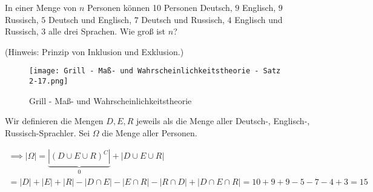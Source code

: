 
\begin{exercise}

In einer Menge von $n$ Personen können 10 Personen Deutsch, $9$ Englisch, $9$ Russisch, $5$ Deutsch und Englisch, $7$ Deutsch und Russisch, $4$ Englisch und Russisch, $3$ alle drei Sprachen.
Wie groß ist $n$?

(Hinweis: Prinzip von Inklusion und Exklusion.)

\end{exercise}


\begin{solution}

\phantom{}



\begin{figure}[h!]
  \centering
  \texttt{[image: Grill - Maß- und Wahrscheinlichkeitstheorie - Satz 2-17.png]}
  \caption{Grill - Maß- und Wahrscheinlichkeitstheorie}
\end{figure}

Wir definieren die Mengen $D, E, R$ jeweils als die Menge aller Deutsch-, Englisch-, Russisch-Sprachler.
Sei $\Omega$ die Menge aller Personen.

\begin{multline*}
  \implies
  |\Omega|
  =
  \underbrace{|(D \cup E \cup R)^C|}_0
  +
  |D \cup E \cup R| \\
  =
  |D| + |E| + |R| - |D \cap E| - |E \cap R| - |R \cap D| + |D \cap E \cap R|
  =
  10 + 9 + 9 - 5 - 7 - 4 + 3
  =
  15
\end{multline*}

\end{solution}


